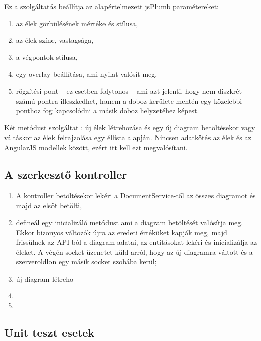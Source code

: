 Ez a szolgáltatás beállítja az alapértelmezett jsPlumb paramétereket:

\begin{enumerate}
\item az élek görbülésének mértéke és stílusa,
\item az élek színe, vastagsága,
\item a végpontok stílusa,
\item egy overlay beállítása, ami nyilat valósít meg,
\item  rögzítési pont -- ez esetben folytonos -- ami azt jelenti, hogy nem diszkrét számú pontra illeszkedhet, hanem a doboz kerülete mentén egy közelebbi ponthoz fog kapcsolódni a másik doboz helyzetéhez képest.
\end{enumerate}

Két metódust szolgáltat : új élek létrehozása és egy új diagram betöltésekor  vagy váltáskor az élek felrajzolása egy éllista alapján.
Nincsen adatkötés az élek és az AngularJS modellek között, ezért itt kell ezt megvalósítani.


\subsection{A szerkesztő kontroller}

\begin{enumerate}
\item A kontroller betöltésekor lekéri a DocumentService-től az összes diagramot és majd az elsőt betölti,
\item defineál egy inicializáló metódust ami a diagram betöltését valósítja meg. Ekkor bizonyos változók újra az eredeti értéküket kapják meg, majd frissülnek az API-ból a diagram adatai, az entitásokat lekéri és inicializálja az éleket. A végén socket üzenetet küld arról, hogy az új diagramra váltott és a szerveroldlon egy másik socket szobába kerül;
\item új diagram létreho
\item 
\item 
\end{enumerate}


\subsection{Unit teszt esetek}





